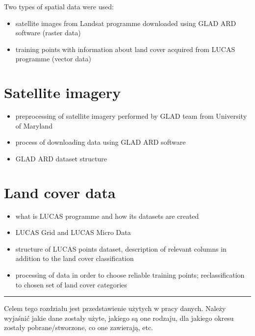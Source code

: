 \documentclass{amuthesis}
\begin{document}
Two types of spatial data were used:

\begin{itemize}
\item
  satellite images from Landsat programme downloaded using GLAD ARD
  software (raster data)
\item
  training points with information about land cover acquired from LUCAS
  programme (vector data)
\end{itemize}

\hypertarget{sec-sat}{%
\section{Satellite imagery}\label{sec-sat}}

\begin{itemize}
\item
  preprocessing of satellite imagery performed by GLAD team from
  University of Maryland
\item
  process of downloading data using GLAD ARD software
\item
  GLAD ARD dataset structure
\end{itemize}

\hypertarget{sec-landcover}{%
\section{Land cover data}\label{sec-landcover}}

\begin{itemize}
\item
  what is LUCAS programme and how its datasets are created
\item
  LUCAS Grid and LUCAS Micro Data
\item
  structure of LUCAS points dataset, description of relevant columns in
  addition to the land cover classification
\item
  processing of data in order to choose reliable training points;
  reclassification to chosen set of land cover categories
\end{itemize}

\begin{center}\rule{0.5\linewidth}{0.5pt}\end{center}

Celem tego rozdziału jest przedstawienie użytych w pracy danych. Należy
wyjaśnić jakie dane zostały użyte, jakiego są one rodzaju, dla jakiego
okresu zostały pobrane/stworzone, co one zawierają, etc.
\end{document}
